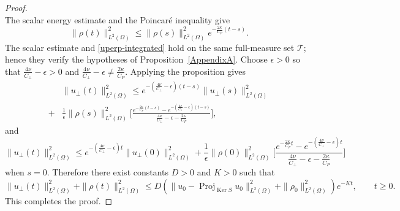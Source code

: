 \documentclass[11pt,reqno]{amsart}
\theoremstyle{plain}
\numberwithin{equation}{section}
\DeclareMathOperator{\kernel}{Ker}
\DeclareMathOperator{\Proj}{Proj}
\begin{document}
\begin{proof}
\begin{equation}
\end{equation}
The scalar energy estimate and the Poincar\'e inequality give
\begin{equation*}
    \|\rho(t)\|^2_{L^2(\Omega)}\le\|\rho(s)\|^2_{L^2(\Omega)}e^{-\frac{2\kappa}{C_P}(t-s)}.
\end{equation*}
The scalar estimate and \eqref{uperp-integrated} hold on the same full-measure set $\mathcal T$; hence they verify the hypotheses of Proposition~\ref{AppendixA}. Choose $\epsilon>0$ so that $\frac{4\nu}{C_\perp}-\epsilon>0$ and $\frac{4\nu}{C_\perp}-\epsilon\neq \frac{2\kappa}{C_P}$. Applying the proposition gives
\begin{equation}
\begin{split}
    &\|u_\perp(t)\|^2_{L^2(\Omega)}\le e^{-(\frac{4\nu}{C_\perp}-\epsilon)(t-s)}\|u_\perp(s)\|^2_{L^2(\Omega)}\\
    +&\frac{1}{\epsilon}\|\rho(s)\|^2_{L^2(\Omega)}\big[\frac{e^{-\frac{2\kappa}{C_P}(t-s)}-e^{-(\frac{4\nu}{C_\perp}-\epsilon)(t-s)}}{\frac{4\nu}{C_\perp}-\epsilon-\frac{2\kappa}{C_P}}\big],
\end{split}
\end{equation}
and 
\begin{equation}
    \|u_\perp(t)\|^2_{L^2(\Omega)}\le e^{-(\frac{4\nu}{C_\perp}-\epsilon)t}\|u_\perp(0)\|^2_{L^2(\Omega)}+\frac{1}{\epsilon}\|\rho(0)\|^2_{L^2(\Omega)}\big[\frac{e^{-\frac{2\kappa}{C_P}t}-e^{-(\frac{4\nu}{C_\perp}-\epsilon)t}}{\frac{4\nu}{C_\perp}-\epsilon-\frac{2\kappa}{C_P}}\big]
\end{equation}
when $s=0$.
Therefore there exist constants $D>0$ and $K>0$ such that
\[
\|u_\perp(t)\|_{L^2(\Omega)}^2+\|\rho(t)\|_{L^2(\Omega)}^2\le D(\|u_0-\Proj_{\kernel S}u_0\|^2_{L^2(\Omega)}+\|\rho_0\|^2_{L^2(\Omega)})e^{-Kt},
\qquad t\ge0.
\]
This completes the proof.
\end{proof}
\end{document}
